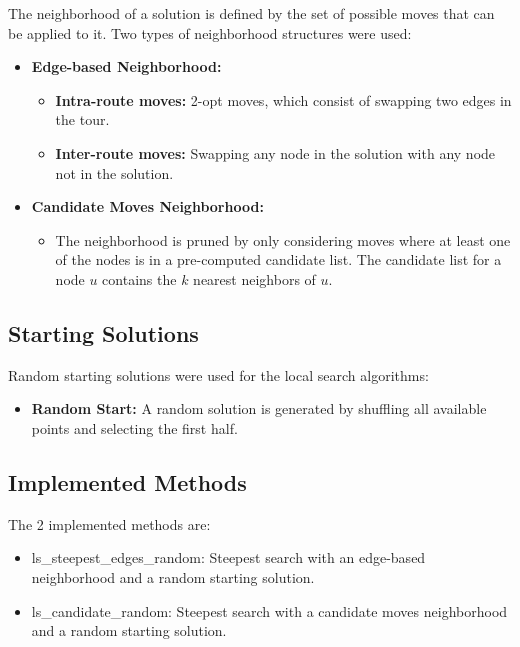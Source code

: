 The neighborhood of a solution is defined by the set of possible moves that can be applied to it. Two types of neighborhood structures were used:

\begin{itemize}
    \item \textbf{Edge-based Neighborhood:}
    \begin{itemize}
        \item \textbf{Intra-route moves:} 2-opt moves, which consist of swapping two edges in the tour.
        \item \textbf{Inter-route moves:} Swapping any node in the solution with any node not in the solution.
    \end{itemize}
    \item \textbf{Candidate Moves Neighborhood:}
    \begin{itemize}
        \item The neighborhood is pruned by only considering moves where at least one of the nodes is in a pre-computed candidate list. The candidate list for a node $u$ contains the $k$ nearest neighbors of $u$.
    \end{itemize}
\end{itemize}

\subsection{Starting Solutions}

Random starting solutions were used for the local search algorithms:

\begin{itemize}
    \item \textbf{Random Start:} A random solution is generated by shuffling all available points and selecting the first half.
\end{itemize}

\subsection{Implemented Methods}

The 2 implemented methods are:

\begin{itemize}
    \item ls\_steepest\_edges\_random: Steepest search with an edge-based neighborhood and a random starting solution.
    \item ls\_candidate\_random: Steepest search with a candidate moves neighborhood and a random starting solution.
\end{itemize}